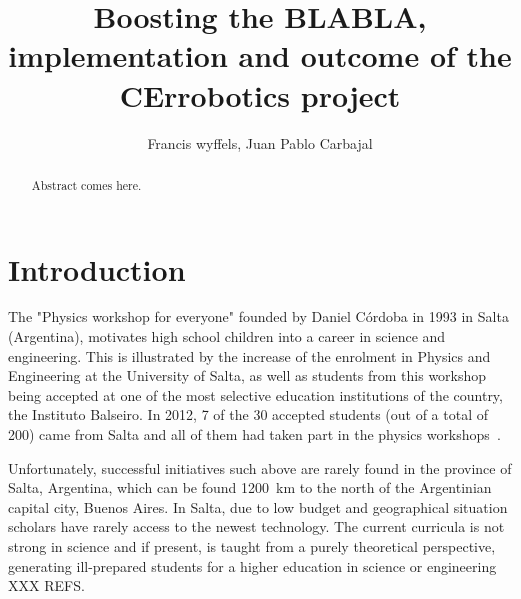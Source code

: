 \documentclass[a4paper]{llncs}
\begin{document}
\linespread{0.965}\selectfont

\mainmatter  %

\title{Boosting the BLABLA, implementation and outcome of the CErrobotics project}

%
%
\author{Francis wyffels, Juan Pablo Carbajal}
%


\maketitle

\begin{abstract}
Abstract comes here.

\end{abstract}

\section{Introduction}
 The "Physics workshop for everyone" founded by Daniel Córdoba in 1993 in Salta (Argentina), motivates high school children into a career in science and engineering.
This is illustrated by the increase of the enrolment in Physics and Engineering at the University of Salta, as well as students from this workshop being accepted at one of the most selective education institutions of the country, the Instituto Balseiro.
In 2012, 7 of the 30 accepted students (out of a total of 200) came from Salta and all of them had taken part in the physics workshops~\cite{salta2012}.

Unfortunately, successful initiatives such above are rarely found in the province of Salta, Argentina, which can be found 1200~km to the north of the Argentinian capital city, Buenos Aires.
In Salta, due to low budget and geographical situation scholars have rarely access to the newest technology.
The current curricula is not strong in science and if present, is taught from a purely theoretical perspective, generating ill-prepared students for a higher education in science or engineering XXX REFS.
\end{document}

